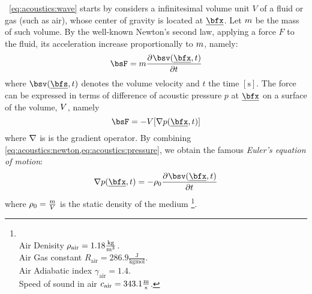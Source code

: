 ~\cref{eq:acoustics:wave} starts by considers a infinitesimal volume unit $V$ of a fluid or gas (such as air), whose center of gravity is located at $\positionMicrophone$.
Let $m$ be the mass of such volume.
By the well-known Newton's second law, applying a force $F$ to the fluid, its acceleration increase proportionally to $m$,
namely:
\begin{equation}
    \label{eq:acoustics:newton}
    \forceVec = \mass \kpderiv[]{\velocity\depSpaceTime}{t}
\end{equation}
where $\velocity(\positionSource, t)$ denotes the volume velocity and $t$ the time $[\si{\second}]$.
The force can be expressed in terms of difference of acoustic pressure $p$ at $\positionMicrophone$ on a surface of the volume, $V$, namely
\begin{equation}
    \label{eq:acoustics:pressure}
    \forceVec = - V \kbracket{\kgrad{\pressureSpaceTime}}
\end{equation}
where $\mathop{}\!\mathbin{\nabla}{}{}$ is is the gradient operator.
By combining \cref{eq:acoustics:newton,eq:acoustics:pressure}, we obtain the famous \textit{Euler's equation of motion}:
\begin{equation}
    \label{eq:acoustics:euler}
    \kgrad{\pressureSpaceTime} = - \densityEq \kpderiv[]{\velocity\depSpaceTime}{t}
\end{equation}
where $\rho_0 = \frac{m}{V}$ is the static density of the medium
\footnote{%
\label{fn:acoustics:airconstanc}
\\Air Denisity $\rho_{\text{air}} = 1.18 \tfrac{\si{\kilogram}}{\si{\metre^3}}$.
\\Air Gas constant $R_{\text{air}} = 286.9 \tfrac{\si{\joule}}{\si{\kilogram} \si{\mole}}$.
\\Air Adiabatic index $\gamma_{\text{air}} = 1.4$.
\\Speed of sound in air $c_{\text{air}} = 343.1 \tfrac{\si{\metre}}{\si{\second}}$.
}.


